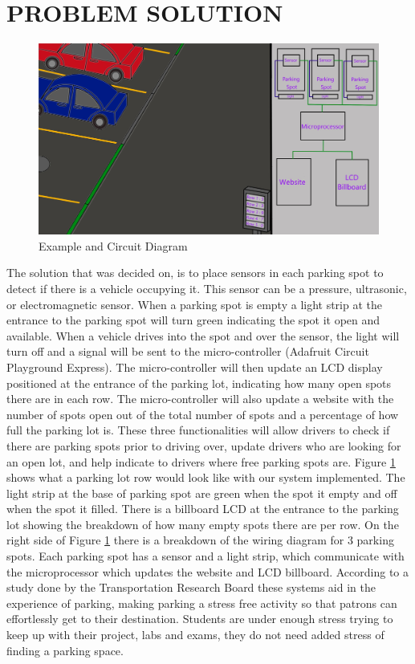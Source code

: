 \documentclass[12pt]{article}
\begin{document}
\section{PROBLEM SOLUTION}
\begin{figure}[!h]
	\centering
	\includegraphics[width=6in]{parkingDiagram.jpg}
	\caption{Example and Circuit Diagram}
	\label{fig:cpx}
\end{figure}
The solution that was decided on, is to place sensors in each parking spot to detect if there is a vehicle occupying it. This sensor can be a pressure, ultrasonic, or electromagnetic sensor. When a parking spot is empty a light strip at the entrance to the parking spot will turn green indicating the spot it open and available. When a vehicle drives into the spot and over the sensor, the light will turn off and a signal will be sent to the micro-controller (Adafruit Circuit Playground Express). The micro-controller will then update an LCD display positioned at the entrance of the parking lot, indicating how many open spots there are in each row. The micro-controller will also update a website with the number of spots open out of the total number of spots and a percentage of how full the parking lot is. These three functionalities will allow drivers to check if there are parking spots prior to driving over, update drivers who are looking for an open lot, and help indicate to drivers where free parking spots are. Figure \ref{fig:cpx} shows what a parking lot row would look like with our system implemented. The light strip at the base of parking spot are green when the spot it empty and off when the spot it filled. There is a billboard LCD at the entrance to the parking lot showing the breakdown of how many empty spots there are per row. On the right side of Figure \ref{fig:cpx} there is a breakdown of the wiring diagram for 3 parking spots. Each parking spot has a sensor and a light strip, which communicate with the microprocessor which updates the website and LCD billboard. According to a study done by the Transportation Research Board \cite{Harding} these systems aid in the experience of parking, making parking a stress free activity so that patrons can effortlessly get to their destination. Students are under enough stress trying to keep up with their project, labs and exams, they do not need added stress of finding a parking space. 
\end{document}
